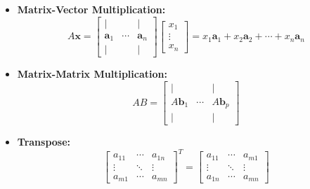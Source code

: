 \documentclass{article}
\begin{document}
\begin{itemize}
    \item \textbf{Matrix-Vector Multiplication:}
    \begin{equation}
        A\mathbf{x} =
        \left[
            \begin{array}{ccc}
                | &        & | \\
                \mathbf{a}_1 & \cdots & \mathbf{a}_n \\
                | &        & |
            \end{array}
        \right]
        \left[
            \begin{array}{c}
                x_1 \\
                \vdots \\
                x_n
            \end{array}
        \right]
        =
        x_1\mathbf{a}_1 + x_2\mathbf{a}_2 + \cdots + x_n\mathbf{a}_n
        \label{eq:matvec}
    \end{equation}

    \item \textbf{Matrix-Matrix Multiplication:}
    \begin{equation}
        AB =
        \left[
            \begin{array}{ccc}
                | &        & | \\
                A\mathbf{b}_1 & \cdots & A\mathbf{b}_p \\
                | &        & |
            \end{array}
        \right]
        \label{eq:mul}
    \end{equation}

    \item \textbf{Transpose:}
    \begin{equation}
        \left[
            \begin{array}{ccc}
                a_{11} & \cdots & a_{1n} \\
                \vdots & \ddots & \vdots \\
                a_{m1} & \cdots & a_{mn}
            \end{array}
        \right]^T
        =
        \left[
            \begin{array}{ccc}
                a_{11} & \cdots & a_{m1} \\
                \vdots & \ddots & \vdots \\
                a_{1n} & \cdots & a_{mn}
            \end{array}
        \right]
        \label{eq:trans}
    \end{equation}


\end{itemize}
\end{document}
